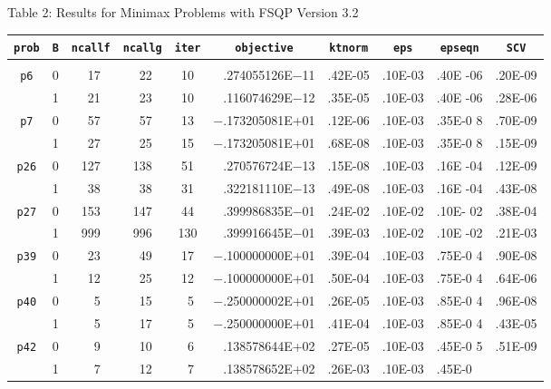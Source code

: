 \nopagebreak
\hspace{6em}Table 2: Results for Minimax Problems with FSQP Version 3.2

\newpage
\renewcommand{\baselinestretch}{0.924} %
 \footnotesize{
\begin{tabular}{cccccrllll} \hline
\multicolumn{1}{c}{{\tt prob}} & 
\multicolumn{1}{c}{{\tt B}} & 
\multicolumn{1}{c}{{\tt ncallf}} & 
\multicolumn{1}{c}{{\tt ncallg}} & 
\multicolumn{1}{c}{{\tt iter}} &
\multicolumn{1}{c}{{\tt objective}} & 
\multicolumn{1}{c}{{\tt ktnorm}} & 
\multicolumn{1}{c}{{\tt eps}} & 
\multicolumn{1}{c}{{\tt epseqn}} & 
\multicolumn{1}{c}{{\tt SCV}} \\ \hline \\

 {\tt  p6} &0 &~17   &  ~22  &10  &   .274055126E$-$11 &.42E-05 & .10E-03 &.40E
-06&.20E-09\\
           &1 &~21   &  ~23  &10  &   .116074629E$-$12 &.35E-05 & .10E-03 &.40E
-06&.28E-06\\\hline
 {\tt  p7} &0 &~57   &  ~57  &13  &$-$.173205081E+01 &.12E-06 & .10E-03 &.35E-0
8&.70E-09\\
           &1 & ~27  &  ~25  & 15 &$-$.173205081E+01 &.68E-08 & .10E-03 &.35E-0
8&.15E-09\\\hline
 {\tt p26} &0 & 127  &  138  & 51 &   .270576724E$-$13 &.15E-08 & .10E-03 &.16E
-04&.12E-09\\
           &1 & ~38  &  ~38  & 31 &   .322181110E$-$13 &.49E-08 & .10E-03 &.16E
-04&.43E-08\\\hline
 {\tt p27} &0 & 153 &  147  & 44 &   .399986835E$-$01 &.24E-02 & .10E-02 &.10E-
02&.38E-04\\
           &1 & 999  &  996  &130 &   .399916645E$-$01 &.39E-03 & .10E-02 &.10E
-02&.21E-03\\\hline
 {\tt p39} &0 &~23   & ~49   & 17 &$-$.100000000E+01 &.39E-04 & .10E-03 &.75E-0
4&.90E-08\\
           &1 &~12   & ~25   &12  &$-$.100000000E+01 &.50E-04 & .10E-03 &.75E-0
4&.64E-06\\\hline
 {\tt p40} &0 &~~5   &  ~15  & ~5 &$-$.250000002E+01 &.26E-05 & .10E-03 &.85E-0
4&.96E-08\\
           &1 &~~5   &  ~17  &~5  &$-$.250000000E+01 &.41E-04 & .10E-03 &.85E-0
4&.43E-05\\\hline
 {\tt p42} &0 &~~9   &  ~10  &~6  &   .138578644E+02 &.27E-05 & .10E-03 &.45E-0
5&.51E-09\\
           &1 &~~7   &  ~12  &~7  &   .138578652E+02 &.26E-03 & .10E-03 &.45E-0

\end{tabular}}
